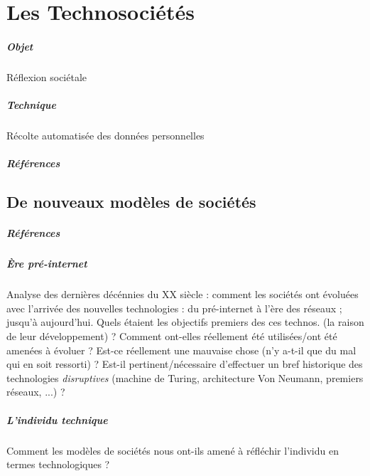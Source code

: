 \chapter{Les Technosociétés}
\paragraph{Objet} Réflexion sociétale
\paragraph{Technique} Récolte automatisée des données personnelles
\paragraph{Références}
\cite{Damasio:0}
\cite{Damasio:1}
\cite{Deleuze:0}
\cite{Foucault:0}
\cite{Huxley:0}
\cite{Klein:0}
\cite{Marx:0}
\cite{Marx:1}
\cite{Moore:0}
\cite{Negri:0}
\cite{Nietzsche:0}
\cite{Orwell:0}
\cite{Pieces:0}
\cite{Rabhi:0}
\cite{Rufin:0}
\cite{Arte:0}
\cite{GhostInTheShell}
\cite{Gunnm}
\cite{PsychoPass}

\section{De nouveaux modèles de sociétés}
\paragraph{Références} \cite{Marx:0} \cite{Marx:1} \cite{Nietzsche:0}

\paragraph{Ère pré-internet} Analyse des dernières décénnies du XX siècle :
comment les sociétés ont évoluées avec l'arrivée des nouvelles technologies : du
pré-internet à l'ère des réseaux ; jusqu'à aujourd'hui. Quels étaient les objectifs
premiers des ces technos. (la raison de leur développement) ? Comment ont-elles réellement
 été utilisées/ont été amenées à évoluer ? Est-ce réellement une mauvaise chose (n'y
 a-t-il que du mal qui en soit ressorti) ? Est-il pertinent/nécessaire d'effectuer un bref
 historique des technologies \emph{disruptives} (machine de Turing, architecture
 Von Neumann, premiers réseaux, ...) ?

\paragraph{L'individu technique} Comment les modèles de sociétés nous ont-ils amené à
réfléchir l'individu en termes technologiques ?



